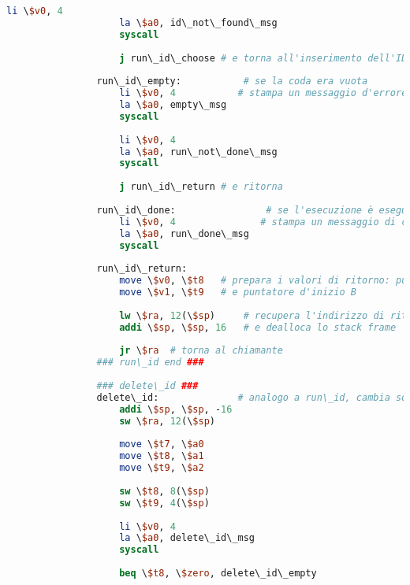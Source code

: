 \begin{center}
\begin{lstlisting}[language=mips, gobble=14, stepnumber=1]
                    li \$v0, 4
                    la \$a0, id\_not\_found\_msg
                    syscall
                    
                    j run\_id\_choose # e torna all'inserimento dell'ID
                    
                run\_id\_empty:           # se la coda era vuota
                    li \$v0, 4           # stampa un messaggio d'errore
                    la \$a0, empty\_msg
                    syscall
                    
                    li \$v0, 4
                    la \$a0, run\_not\_done\_msg
                    syscall
                    
                    j run\_id\_return # e ritorna
                    
                run\_id\_done:                # se l'esecuzione è eseguita con successo
                    li \$v0, 4               # stampa un messaggio di corretta terminazione
                    la \$a0, run\_done\_msg
                    syscall
                
                run\_id\_return:
                    move \$v0, \$t8   # prepara i valori di ritorno: puntatore d'inizio A
                    move \$v1, \$t9   # e puntatore d'inizio B
                    
                    lw \$ra, 12(\$sp)     # recupera l'indirizzo di ritorno dallo stack
                    addi \$sp, \$sp, 16   # e dealloca lo stack frame
                    
                    jr \$ra  # torna al chiamante
                ### run\_id end ###
                
                ### delete\_id ###
                delete\_id:              # analogo a run\_id, cambia soltanto la parte centrale
                    addi \$sp, \$sp, -16
                    sw \$ra, 12(\$sp)
                
                    move \$t7, \$a0
                    move \$t8, \$a1
                    move \$t9, \$a2
                    
                    sw \$t8, 8(\$sp)
                    sw \$t9, 4(\$sp)
                
                    li \$v0, 4
                    la \$a0, delete\_id\_msg
                    syscall
                    
                    beq \$t8, \$zero, delete\_id\_empty
                    

\end{lstlisting}
\end{center}
